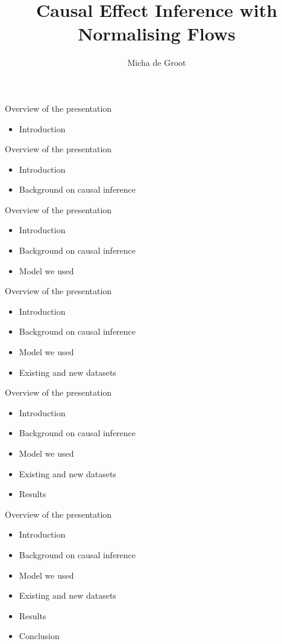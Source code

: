\documentclass[dvipsnames, aspectratio=169]{beamer}
\title{Causal Effect Inference with Normalising Flows}
\author{Micha de Groot}
\begin{document}
	
	\begin{frame}
		\titlepage
	\end{frame}
	
	\begin{frame}{Overview of the presentation}
	    \begin{itemize}
	        \item Introduction
	    \end{itemize}
	\end{frame}
	\begin{frame}{Overview of the presentation}
	    \begin{itemize}
	        \item Introduction
	        \item Background on causal inference
	    \end{itemize}
	\end{frame}
	\begin{frame}{Overview of the presentation}
	    \begin{itemize}
	        \item Introduction
	        \item Background on causal inference
	        \item Model we used
	    \end{itemize}
	\end{frame}
	\begin{frame}{Overview of the presentation}
	    \begin{itemize}
	        \item Introduction
	        \item Background on causal inference
	        \item Model we used
	        \item Existing and new datasets
	    \end{itemize}
	\end{frame}
	\begin{frame}{Overview of the presentation}
	    \begin{itemize}
	        \item Introduction
	        \item Background on causal inference
	        \item Model we used
	        \item Existing and new datasets
	        \item Results
	    \end{itemize}
	\end{frame}
		\begin{frame}{Overview of the presentation}
	    \begin{itemize}
	        \item Introduction
	        \item Background on causal inference
	        \item Model we used
	        \item Existing and new datasets
	        \item Results
	        \item Conclusion
	    \end{itemize}
	\end{frame}
	
\end{document}
